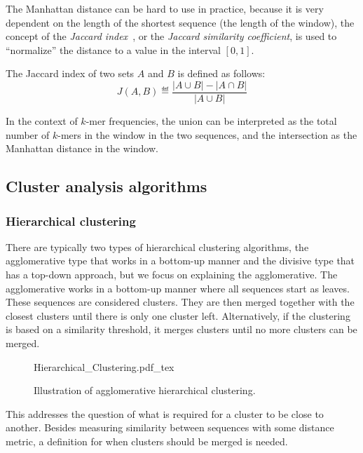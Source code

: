 The Manhattan distance can be hard to use in practice, because it is very
dependent on the length of the shortest sequence (the length of the window),
the concept of the \emph{Jaccard index}~\cite{jaccard1901,jaccard1912}, or the
\emph{Jaccard similarity coefficient}, is used to ``normalize'' the distance to
a value in the interval $[0,1]$.

The Jaccard index of two sets $A$ and $B$ is defined as follows:
\begin{equation}
  J(A, B) \eqdef \frac{|A \cup B| - |A \cap B|}{|A \cup B|}
\end{equation}

In the context of $k$-mer frequencies, the union can be interpreted as the
total number of $k$-mers in the window in the two sequences, and the
intersection as the Manhattan distance in the window.


\subsection{Cluster analysis algorithms}

\subsubsection{Hierarchical clustering}

There are typically two types of hierarchical clustering algorithms, the
agglomerative type that works in a bottom-up manner and the divisive type that
has a top-down approach, but we focus on explaining the agglomerative. The
agglomerative works in a bottom-up manner where all sequences start as leaves.
These sequences are considered clusters. They are then merged together with the
closest clusters until there is only one cluster left. Alternatively, if the
clustering is based on a similarity threshold, it merges clusters until no more
clusters can be merged.

\begin{figure}[H]\centering
\def\svgwidth{\columnwidth}
{Hierarchical_Clustering.pdf_tex}
\caption{Illustration of agglomerative hierarchical clustering.}
\end{figure}

This addresses the question of what is required for a cluster to be close to another.
Besides measuring similarity between sequences with some distance
metric, a definition for when clusters should be merged is needed.


